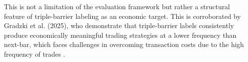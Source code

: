 This is not a limitation of the evaluation framework but rather a structural feature of triple-barrier labeling as an economic target. This is corroborated by Gradzki et al. (2025), who demonstrate that triple-barrier labels consistently produce economically meaningful trading strategies at a lower frequency than next-bar, which faces challenges in overcoming transaction costs due to the high frequency of trades \cite{gradzkiAlgorithmicCryptoTrading2025}.
